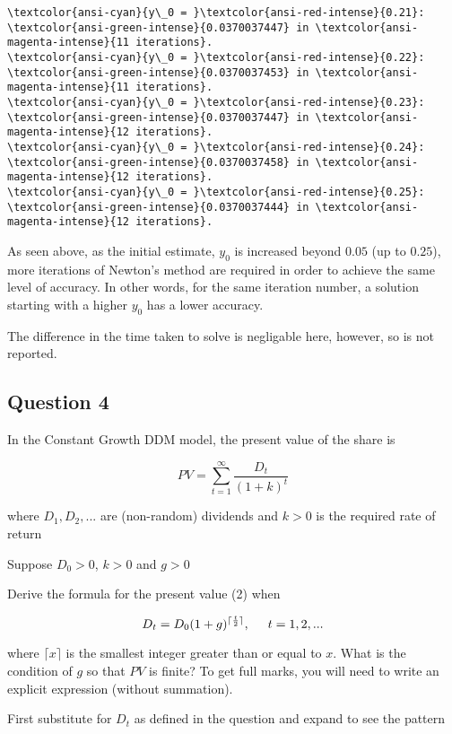 \documentclass[11pt]{article}
\begin{document}
\begin{Verbatim}[commandchars=\\\{\}]
\textcolor{ansi-cyan}{y\_0 = }\textcolor{ansi-red-intense}{0.21}:  \textcolor{ansi-green-intense}{0.0370037447} in \textcolor{ansi-magenta-intense}{11 iterations}.
\textcolor{ansi-cyan}{y\_0 = }\textcolor{ansi-red-intense}{0.22}:  \textcolor{ansi-green-intense}{0.0370037453} in \textcolor{ansi-magenta-intense}{11 iterations}.
\textcolor{ansi-cyan}{y\_0 = }\textcolor{ansi-red-intense}{0.23}:  \textcolor{ansi-green-intense}{0.0370037447} in \textcolor{ansi-magenta-intense}{12 iterations}.
\textcolor{ansi-cyan}{y\_0 = }\textcolor{ansi-red-intense}{0.24}:  \textcolor{ansi-green-intense}{0.0370037458} in \textcolor{ansi-magenta-intense}{12 iterations}.
\textcolor{ansi-cyan}{y\_0 = }\textcolor{ansi-red-intense}{0.25}:  \textcolor{ansi-green-intense}{0.0370037444} in \textcolor{ansi-magenta-intense}{12 iterations}.
    \end{Verbatim}

    As seen above, as the initial estimate, \(y_0\) is increased beyond
\(0.05\) (up to \(0.25\)), more iterations of Newton's method are
required in order to achieve the same level of accuracy. In other words,
for the same iteration number, a solution starting with a higher \(y_0\)
has a lower accuracy.

The difference in the time taken to solve is negligable here, however,
so is not reported.

    \subsection{Question 4}\label{question-4}

In the Constant Growth DDM model, the present value of the share is

\[PV = \sum_{t=1}^{\infty} \frac{D_t}{(1 + k)^t}\]

where \(D_1, D_2, ...\) are (non-random) dividends and \(k > 0\) is the
required rate of return

Suppose \(D_0 > 0\), \(k > 0\) and \(g > 0\)

Derive the formula for the present value (2) when

\[D_t = D_0 (1 + g)^{\lceil \frac{t}{2} \rceil}, \hspace{0.5cm} t = 1, 2, ...\]

where \(\lceil x \rceil\) is the smallest integer greater than or equal
to \(x\). What is the condition of \(g\) so that \(PV\) is finite? To
get full marks, you will need to write an explicit expression (without
summation).

    First substitute for \(D_t\) as defined in the question and expand to
see the pattern
\end{document}
